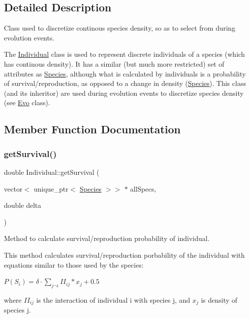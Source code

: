\subsection{Detailed Description}
Class used to discretize continous species density, so as to select from during evolution events. 

The \hyperlink{classIndividual}{Individual} class is used to represent discrete individuals of a species (which has continous density). It has a similar (but much more restricted) set of attributes as \hyperlink{classSpecies}{Species}, although what is calculated by individuals is a probability of survival/reproduction, as opposed to a change in density (\hyperlink{classSpecies}{Species}). This class (and its inheritor) are used during evolution events to discretize species density (see \hyperlink{classEvo}{Evo} class). 

\subsection{Member Function Documentation}
\hypertarget{classIndividual_a895954f2c3a683dd3bd7475651a38160}{}\label{classIndividual_a895954f2c3a683dd3bd7475651a38160} 
\subsubsection{\texorpdfstring{get\+Survival()}{getSurvival()}}
{\footnotesize\ttfamily double Individual\+::get\+Survival (\begin{DoxyParamCaption}\item[{vector$<$ unique\+\_\+ptr$<$ \hyperlink{classSpecies}{Species} $>$$>$ $\ast$}]{all\+Specs,  }\item[{double}]{delta }\end{DoxyParamCaption})\hspace{0.3cm}{\ttfamily [virtual]}}



Method to calculate survival/reproduction probability of individual. 

This method calculates survival/reproduction porbability of the individual with equations similar to those used by the species\+:

$P(S_i) = \delta \cdot \sum_{j \neg i} II_{ij}*x_j +0.5$

where $II_{ij}$ is the interaction of individual i with species j, and $x_j$ is density of species j.


